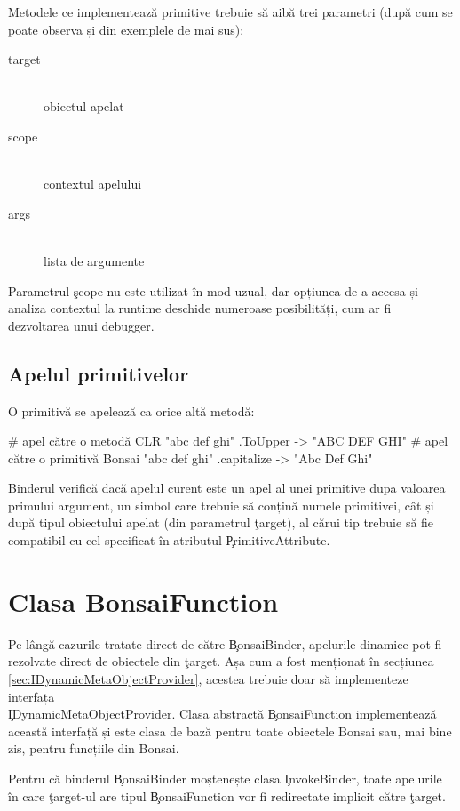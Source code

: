 \documentclass[12pt,a4paper]{memoir}
\begin{document}
Metodele ce implementează primitive trebuie să aibă trei parametri (după cum se poate observa și din exemplele de mai sus):
\begin{description}
\item[target]\hfill\\ obiectul apelat
\item[scope]\hfill\\ contextul apelului
\item[args]\hfill\\ lista de argumente
\end{description}

Parametrul \c{scope} nu este utilizat în mod uzual, dar opțiunea de a accesa și analiza contextul la runtime deschide numeroase posibilități, cum ar fi dezvoltarea unui debugger.

\subsection{Apelul primitivelor}

O primitivă se apelează ca orice altă metodă:
\begin{code}
# apel către o metodă CLR
"abc def ghi" .ToUpper
  -> "ABC DEF GHI"
# apel către o primitivă Bonsai
"abc def ghi" .capitalize
  -> "Abc Def Ghi"
\end{code}

Binderul verifică dacă apelul curent este un apel al unei primitive dupa valoarea primului argument, un simbol care trebuie să conțină numele primitivei, cât și după tipul obiectului apelat (din parametrul \c{target}), al cărui tip trebuie să fie compatibil cu cel specificat în atributul \c{PrimitiveAttribute}.

\section{Clasa BonsaiFunction}

Pe lângă cazurile tratate direct de către \c{BonsaiBinder}, apelurile dinamice pot fi rezolvate direct de obiectele din \c{target}. Așa cum a fost menționat în secțiunea \ref{sec:IDynamicMetaObjectProvider}, acestea trebuie doar să implementeze interfața\\ \c{IDynamicMetaObjectProvider}. Clasa abstractă \c{BonsaiFunction} implementează această interfață și este clasa de bază pentru toate obiectele Bonsai sau, mai bine zis, pentru funcțiile din Bonsai.

Pentru că binderul \c{BonsaiBinder} moștenește clasa \c{InvokeBinder}, toate apelurile în care \c{target}-ul are tipul \c{BonsaiFunction} vor fi redirectate implicit către \c{target}.
\end{document}
